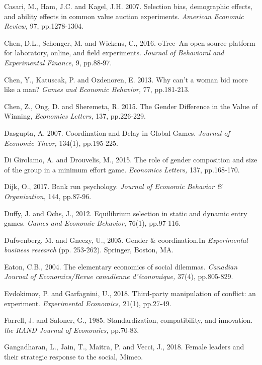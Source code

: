 \documentclass[11pt,english]{article}
\begin{document}
\begin{thebibliography}{10}
\bibitem{} Casari, M., Ham, J.C. and Kagel, J.H. 2007. Selection bias, demographic effects, and ability effects in common value auction experiments. \textit{American Economic Review,} 97, pp.1278-1304.

 Chen, D.L., Schonger, M. and Wickens, C., 2016. oTree--An open-source platform for laboratory, online, and field experiments. \textit{Journal of Behavioral and Experimental Finance,} 9, pp.88-97.

 Chen, Y., Katuscak, P. and Ozdenoren, E. 2013. Why can't a woman bid more like a man? \textit{Games and Economic Behavior,} 77, pp.181-213.

 Chen, Z., Ong, D. and Sheremeta, R. 2015. The Gender Difference in the Value of Winning, \textit{Economics Letters,} 137, pp.226-229.

Dasgupta, A. 2007. Coordination and Delay in Global Games. \textit{Journal of Economic Theor,} 134(1), pp.195-225.

 Di Girolamo, A. and Drouvelis, M., 2015. The role of gender composition and size of the group in a minimum effort game. \textit{Economics Letters,} 137, pp.168-170.

 Dijk, O., 2017. Bank run psychology. \textit{Journal of Economic Behavior \& Organization,} 144, pp.87-96.

\bibitem{} Duffy, J. and Ochs, J., 2012. Equilibrium selection in static and dynamic entry games. \textit{Games and Economic Behavior,} 76(1), pp.97-116.

\bibitem{} Dufwenberg, M. and Gneezy, U., 2005. Gender \& coordination.In \textit{Experimental business research} (pp. 253-262). Springer, Boston, MA.

\bibitem{}Eaton, C.B., 2004. The elementary economics of social dilemmas. \textit{Canadian Journal of Economics/Revue canadienne d'\'{e}conomique,} 37(4), pp.805-829.

  Evdokimov, P. and Garfagnini, U., 2018. Third-party manipulation of conflict: an experiment. \textit{Experimental Economics,} 21(1), pp.27-49.

  Farrell, J. and Saloner, G., 1985. Standardization, compatibility, and innovation. \textit{the RAND Journal of Economics,} pp.70-83.

 Gangadharan, L., Jain, T., Maitra, P. and Vecci, J., 2018. Female leaders and their strategic response to the social, Mimeo.


\end{thebibliography}
\end{document}
